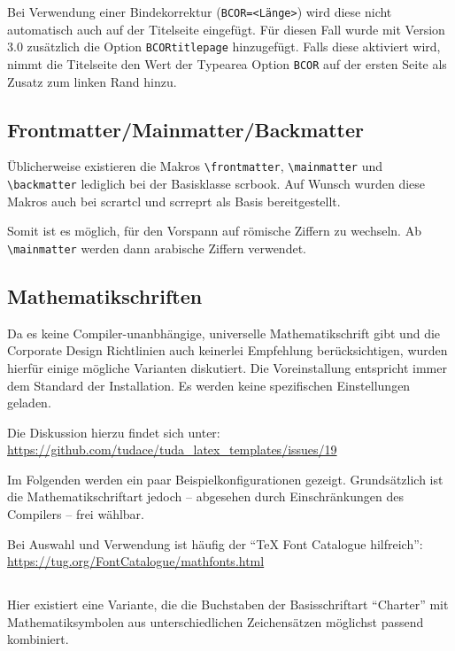 \documentclass[
	ngerman,%
	accentcolor=9c,%
]{tudapub}
\newcommand*{\code}[1]{\texttt{#1}}
\newcommand*{\cls}[1]{\textsf{#1}}
\begin{document}
Bei Verwendung einer Bindekorrektur (\code{BCOR=<Länge>}) wird diese nicht automatisch auch auf der Titelseite eingefügt. Für diesen Fall wurde mit Version 3.0 zusätzlich die Option \code{BCORtitlepage} hinzugefügt. Falls diese aktiviert wird, nimmt die Titelseite den Wert der Typearea Option \code{BCOR} auf der ersten Seite als Zusatz zum linken Rand hinzu.

\subsection{Frontmatter/Mainmatter/Backmatter}
Üblicherweise existieren die Makros \verb+\frontmatter+, \verb+\mainmatter+ und \verb+\backmatter+ lediglich bei der Basisklasse \cls{scrbook}.
Auf Wunsch wurden diese Makros auch bei \cls{scrartcl} und \cls{scrreprt} als Basis bereitgestellt.

Somit ist es möglich, für den Vorspann auf römische Ziffern zu wechseln. Ab \verb+\mainmatter+ werden dann arabische Ziffern verwendet.

\subsection{Mathematikschriften}
Da es keine Compiler-unanbhängige, universelle Mathematikschrift gibt und die Corporate Design Richtlinien auch keinerlei Empfehlung berücksichtigen, wurden hierfür einige mögliche Varianten diskutiert. Die Voreinstallung entspricht immer dem Standard der Installation. Es werden keine spezifischen Einstellungen geladen.

Die Diskussion hierzu findet sich unter:\\
\url{https://github.com/tudace/tuda_latex_templates/issues/19}

Im Folgenden werden ein paar Beispielkonfigurationen gezeigt. Grundsätzlich ist die Mathematikschriftart jedoch -- abgesehen durch Einschränkungen des Compilers -- frei wählbar.

Bei Auswahl und Verwendung ist häufig der \enquote{\TeX{} Font Catalogue hilfreich}: \url{https://tug.org/FontCatalogue/mathfonts.html}

\subsection{}
Hier existiert eine Variante, die die Buchstaben der Basisschriftart \enquote{Charter} mit Mathematiksymbolen aus unterschiedlichen Zeichensätzen möglichst passend kombiniert.
\end{document}
